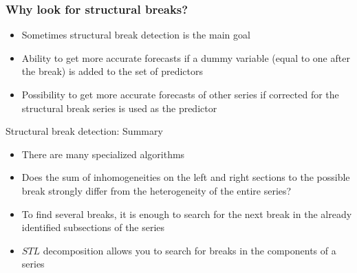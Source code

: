 \begin{frame}
	\frametitle{Why look for structural breaks?}
	
	\begin{itemize}[<+->]
		\item Sometimes structural break detection is the \alert{main goal}
		\item Ability to get \alert{more accurate} forecasts if a dummy variable (equal to one after the break) is added to the set of predictors
		\item Possibility to get \alert{more accurate} forecasts of other series if
		corrected for the structural break series is used as the predictor
	\end{itemize}
	
	
\end{frame}


\begin{frame}{Structural break detection: Summary}
	
	\begin{itemize}[<+->]
		\item There are \alert{many} specialized  algorithms
		\item Does the \alert{sum of inhomogeneities} on the left and right sections to the possible break strongly differ from the heterogeneity of the entire series?
		\item To find \alert{several} breaks, it is enough to search for the next break in the already identified subsections of the series
		\item $STL$ decomposition allows you to search for \alert{breaks in the components} of a series
	\end{itemize}
\end{frame}